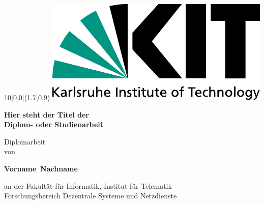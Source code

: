 \newcommand{\diameter}{15} %
\newcommand{\xone}{-60} %
\newcommand{\xtwo}{460} %
\newcommand{\yone}{70} %
\newcommand{\ytwo}{-710} %

\renewcommand{\titlefont}{\sffamily}
\sffamily

\begin{titlepage}


\begin{textblock}{10}[0,0](1.7,0.9)
	\includegraphics[width=.3\textwidth]{Bilder/KITLogo_RGB.pdf}
\end{textblock}

\begin{center}

\vfill
{\huge\bfseries\titlefont \textbf{Hier steht der Titel der\\
                Diplom- oder Studienarbeit} \par}

\vskip 2.0cm

{\Large Diplomarbeit}\\
{\Large von}\\

\vskip 1.0cm

{\LARGE{\textbf{Vorname~Nachname}}}\\

\vskip 1.0cm

{\large an der Fakultät für Informatik, Institut für Telematik}\\
{\large Forschungsbereich Dezentrale Systeme und Netzdienste}\\


\end{center}
\end{titlepage}
